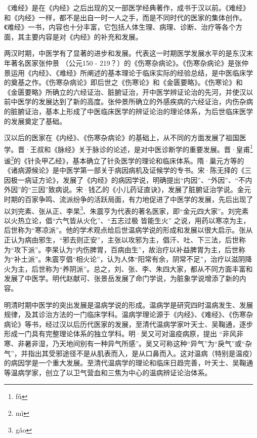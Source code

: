 \documentclass[a4paper,12pt,UTF8,twoside]{ctexbook}
\begin{document}
《难经》是在《内经》之后出现的又一部医学经典著作，成书于汉以前。《难经》和《内经》一样，都不是出自一时一人之手，而是不同时代的医家的集体创作。《难经》一书，内容也十分丰富，它包括人体生理、病理、诊断、治疗等各个方面，其主要内容是对《内经》的补充和发展。

两汉时期，中医学有了显著的进步和发展。代表这一时期医学发展水平的是东汉末年著名医家张仲景 （公元150 - 219？）的《伤寒杂病论》。《伤寒杂病论》是张仲景运用《内经》、《难经》所阐述的基本理论于临床实际的经验总结，是中医临床学的奠基之作。《伤寒杂病论》即后世之《伤寒论》和《金匮要略》。《伤寒论》和《金匮要略》所确立的六经证治、脏腑证治，开中医学辨证论治的先河，并使汉以前中医学的发展达到了新的高度。张仲景所确立的外感疾病的六经证治，内伤杂病的脏腑证治，基本上形成了中医临床医学的辨证论治的理论体系，为后世临床医学的发展奠定了基础。

汉以后的医家在《内经》、《伤寒杂病论》的基础上，从不同的方面发展了祖国医学。晋·王叔和《脉经》关于脉诊的论述，是对中医诊断学的重要发展。晋·皇甫\footnote{f\v{u}}谧\footnote{m\`i}的《针灸甲乙经》，基本确立了针灸医学的理论和临床体系。隋·巢元方等的《诸病源候论》是中医学第一部关于病因病机及证候学的专书。宋·陈无择的《三因极一病证方论》，发展了《内经》的病因学说，明确提出“内因”、“外因”、“不内外因”的“三因”致病说。宋·钱乙的《小儿药证直诀》，发展了脏腑证治学说。金元时期的百家争鸣、流派纷争的活跃局面，有力地促进了中医学的发展，先后出现了以刘完素、张从正、李杲\footnote{g\v{a}o}、朱震亨为代表的著名医家，即“金元四大家”。刘完素以火热立论，倡“六气皆从火化”、“五志过极 皆能生火” 之说，用药以寒凉为主，后世称为“寒凉派”。他的学术观点给后世温病学说的形成和发展以很大启示。张从正认为病由邪生，“邪去则正安”，主张以攻邪为主，倡汗、吐、下三法，后世称为“攻下派”。李杲认为“内伤脾胃，百病由生”，故治疗以补益脾胃为主，后世称为“补土派”。朱震亨倡“相火论”，认为人体“阳常有余，阴常不足”，治疗以滋阴降火为主，后世称为“养阴派”。总之，刘、张、李、朱四大家，都从不同方面丰富和发展了中医学。明代赵献可、张景岳发展了命门学说，为脏象学说增添了新的内容。

明清时期中医学的突出发展是温病学说的形成。温病学是研究四时温病发生、发展规律，及其诊治方法的一门临床学科。温病学理论源于《内经》、《难经》、《伤寒杂病论》等书，经过汉以后历代医家的发展，至清代温病学家叶天士、吴鞠通，逐步形成一门具有完整理论体系的独立学科。明·吴又可对温疫病原，提出 “非风非寒、非暑非湿，乃天地间别有一种异气所感”。吴又可称这种“异气”为“戾气”或“杂气”，并指出其受邪途径不是从肌表而入，是从口鼻而入。这对温病（特别是温疫）的病因学是一个重大发展。至清代温病学的理论和临床日趋完善，叶天士、吴鞠通等温病学家，创立了以卫气营血和三焦为中心的温病辨证论治体系。
\end{document}
